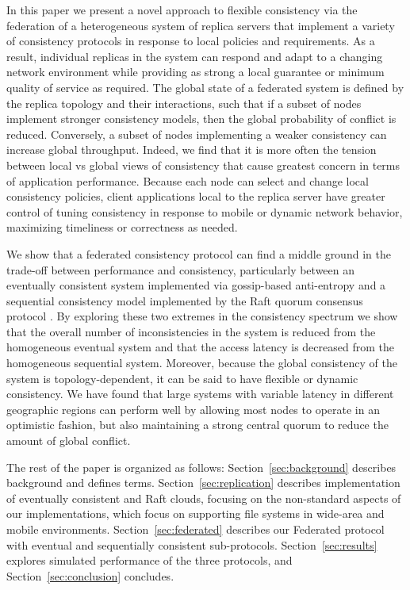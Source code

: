 \documentclass[10pt,conference,letterpaper]{IEEEtran}
\begin{document}
In this paper we present a novel approach to flexible consistency via the federation of a
heterogeneous system of replica servers that implement a variety of consistency protocols
in response to local policies and requirements.
As a result, individual replicas in the system can respond and adapt to a changing network
environment while providing as strong a local guarantee or minimum quality of service as
required.
The global state of a federated system is defined by the replica topology and their
interactions, such that if a subset of nodes implement stronger consistency models, then
the global probability of conflict is reduced.
Conversely, a subset of nodes
implementing a weaker consistency can increase global throughput.
Indeed, we find that it is more often the tension between local vs global views of
consistency that cause greatest concern in terms of application performance.
Because each node can select and change local consistency policies, client applications
local to the replica server have greater control of tuning consistency in response to
mobile or dynamic network behavior, maximizing timeliness or correctness as needed.

We show that a federated consistency protocol can find a middle ground in the trade-off
between performance and consistency, particularly between an eventually consistent system
implemented via gossip-based anti-entropy \cite{kempe_gossip-based_2003} and a sequential
consistency model implemented by the Raft quorum consensus protocol \cite{ongaro_search_2014}.
By exploring these two extremes in the consistency spectrum we show that the overall
number of inconsistencies in the system is reduced from the homogeneous eventual system and
that the access latency is decreased from the homogeneous sequential system.
Moreover, because the global consistency of the system is topology-dependent, it can be
said to have flexible or dynamic consistency.
We have found that large systems with variable latency in different geographic regions can
perform well by allowing most nodes to operate in an optimistic fashion, but also maintaining a
strong central quorum to reduce the amount of global conflict.

The rest of the paper is organized as follows: Section~\ref{sec:background}
describes background and defines terms. Section~\ref{sec:replication}
describes implementation of eventually consistent and Raft clouds, focusing on
the non-standard aspects of our implementations, which focus on supporting
file systems in wide-area and mobile environments.
Section~\ref{sec:federated} describes our Federated protocol with eventual and
sequentially consistent sub-protocols.
Section~\ref{sec:results} explores simulated performance of the three
protocols, and Section~\ref{sec:conclusion} concludes.
\end{document}
